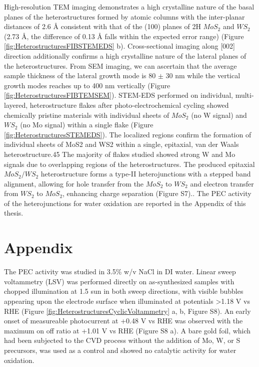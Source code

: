 High-resolution TEM imaging demonstrates a high crystalline nature of the basal planes of the heterostructures formed by atomic columns with the inter-planar distances of 2.6 \r{A} consistent with that of the (100) planes of 2H $MoS_2$ and $WS_2$ (2.73 \r{A}, the difference of 0.13 \r{A} falls within the expected error range) (Figure \ref{fig:HeterostructuresFIBSTEMEDS} b). Cross-sectional imaging along [002] direction additionally confirms a high crystalline nature of the lateral planes of the heterostructures. From SEM imaging, we can ascertain that the average sample thickness of the lateral growth mode is 80 $\pm$ 30 nm while the vertical growth modes reaches up to 400 nm vertically (Figure \ref{fig:HeterostructuresFIBTEMSEM}). STEM-EDS performed on individual, multi-layered, heterostructure flakes after photo-electrochemical cycling showed chemically pristine materials with individual sheets of $MoS_2$ (no W signal) and $WS_2$ (no Mo signal) within a single flake (Figure \ref{fig:HeterostructuresSTEMEDS}). The localized regions confirm the formation of individual sheets of MoS2 and WS2 within a single, epitaxial, van der Waals heterostructure.45 The majority of flakes studied showed strong W and Mo signals due to overlapping regions of the heterostructures. The produced epitaxial $MoS_2/WS_2$ heterostructure forms a type-II heterojunctions with a stepped band alignment, allowing for hole transfer from the $MoS_2$ to $WS_2$ and electron transfer from $WS_2$ to $MoS_2$, enhancing charge separation (Figure S7).\cite{Zhuang2013}\cite{Hong2014}\cite{Ma2018}. 
The PEC activity of the heterojunctions for water oxidation are reported in the Appendix of this thesis. 

\newpage
\section{Appendix}

The PEC activity was studied in 3.5\% w/v NaCl in DI water. Linear sweep voltammetry (LSV) was performed directly on as-synthesized samples with chopped illumination at 1.5 sun in both sweep directions, with visible bubbles appearing upon the electrode surface when illuminated at potentials >1.18 V vs RHE (Figure \ref{fig:HeterostructuresCyclicVoltammetry} a, b, Figure S8). An early onset of measureable photocurrent at +0.48 V vs RHE was observed with the maximum on off ratio at +1.01 V vs RHE (Figure S8 a). A bare gold foil, which had been subjected to the CVD process without the addition of Mo, W, or S precursors, was used as a control and showed no catalytic activity for water oxidation. 

